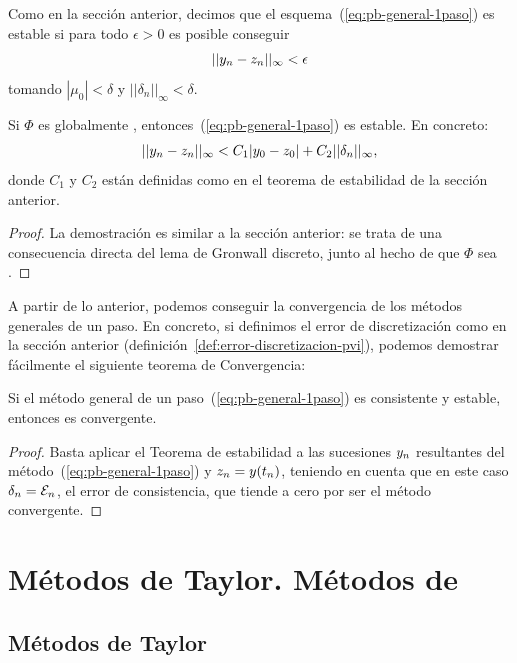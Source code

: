 Como en la sección anterior, decimos que el esquema~(\ref{eq:pb-general-1paso})
es estable si para todo $\epsilon>0$ es posible conseguir
$$
||{y_n} - z_n||_\infty < \epsilon
$$
tomando $|\mu_0|<\delta$ y $||\delta_n||_\infty<\delta$.

\begin{theorem}
  Si $\Phi$ es globalmente \lipschitz,
  entonces~(\ref{eq:pb-general-1paso}) es estable. En concreto:
  $$
  ||{y_n} - z_n||_\infty < C_1|y_0-z_0| + C_2 ||\delta_n||_\infty,
  $$
  donde $C_1$ y $C_2$ están definidas como en el teorema de
  estabilidad de la sección anterior.
\end{theorem}
\begin{proof}
  La demostración es similar a la sección anterior: se trata de una
  consecuencia directa del lema de Gronwall discreto, junto al hecho
  de que $\Phi$ sea \lipschitz.
\end{proof}
A partir de lo anterior, podemos conseguir la convergencia de los
métodos generales de un paso. En concreto, si definimos el error de
discretización como en la sección anterior
(definición~\ref{def:error-discretizacion-pvi}), podemos demostrar
fácilmente el siguiente teorema de Convergencia:

\begin{theorem}
  Si el método general de un paso~(\ref{eq:pb-general-1paso}) es
  consistente y estable, entonces es convergente.
\end{theorem}

\begin{proof}
  Basta aplicar el Teorema de estabilidad a las sucesiones ${y_n}$
  resultantes del método~(\ref{eq:pb-general-1paso}) y $z_n=y({t_n})$,
  teniendo en cuenta que en este caso $\delta_n={\cal E}_n$, el error
  de consistencia, que tiende a cero por ser el método convergente.
\end{proof}

\section{Métodos de Taylor. Métodos de \RK}

\subsection*{Métodos de Taylor}
\label{sec:metodos-de-taylor}

